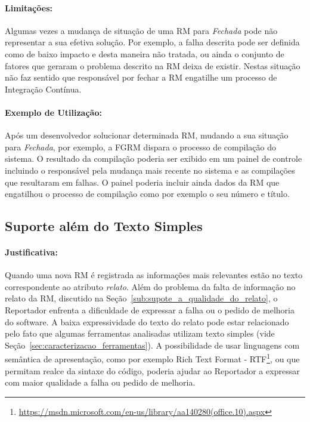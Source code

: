 \paragraph{Limitações:}
\label{par:limitacoes_s05}

Algumas vezes a mudança de situação de uma RM para \textit{Fechada} pode não
representar a sua efetiva solução. Por exemplo, a falha descrita pode ser
definida como de baixo impacto e desta maneira não tratada, ou ainda o conjunto
de fatores que geraram o problema descrito na RM deixa de existir. Nestas
situação não faz sentido que responsável por fechar a RM engatilhe um processo
de Integração Contínua.

\paragraph{Exemplo de Utilização:}
\label{par:exemplo_de_utilização_s05}

Após um desenvolvedor solucionar determinada RM, mudando a sua situação para
\textit{Fechada}, por exemplo, a FGRM dispara o processo de compilação do
sistema. O resultado da compilação poderia ser exibido em um painel de controle
incluindo o responsável pela mudança mais recente no sistema e as compilações
que resultaram em falhas. O painel poderia incluir ainda dados da RM que
engatilhou o processo de compilação como por exemplo o seu número e título.

\subsection{Suporte além do Texto Simples}
\label{sub:suporte_linguagem_marcacao}


\paragraph{Justificativa:}
\label{par:justificativa_s06}

Quando uma nova RM é registrada as informações mais relevantes estão no texto
correspondente ao atributo \textit{relato}. Além do problema da falta de
informação no relato da RM, discutido na
Seção~\ref{sub:supote_a_qualidade_do_relato}, o Reportador enfrenta a
dificuldade de expressar a falha ou o pedido de melhoria do software. A baixa
expressividade do texto do relato pode estar relacionado pelo fato que algumas
ferramentas analisadas utilizam texto simples (vide
Seção~\ref{sec:caracterizacao_ferramentas}). A possibilidade de usar linguagens
com semântica de apresentação, como por exemplo Rich Text Format \@-\@
RTF\footnote{\url{https://msdn.microsoft.com/en-us/library/aa140280(office.10).aspx}},
ou que permitam realce da sintaxe do código, poderia ajudar ao Reportador a
expressar com maior qualidade a falha ou pedido de melhoria.

